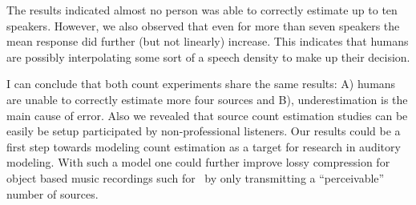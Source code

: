 The results indicated almost no person was able to correctly estimate up to ten speakers. 
However, we also observed that even for more than seven speakers the mean response did further (but not linearly) increase. 
This indicates that humans are possibly interpolating some sort of a speech density to make up their decision.
\par
I can conclude that both count experiments share the same results: A) humans are unable to correctly estimate more four sources and B), underestimation is the main cause of error.
Also we revealed that source count estimation studies can be easily be setup participated by non-professional listeners.
Our results could be a first step towards modeling count estimation as a target for research in auditory modeling. 
With such a model one could further improve lossy compression for object based music recordings such for~\cite{herre12saoc} by only transmitting a ``perceivable'' number of sources.

